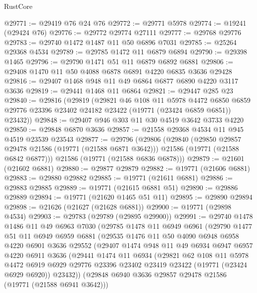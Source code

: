 \begin{lexlean}{RustCore}
\begin{coremodule}
@29771 := @29419 @76 @24 @76
@29772 := @29771 @5978
@29774 := @19241 (@29424 @76)
@29776 := @29772 @29774 @27111
@29777 := @29768 @29776
@29783 := @29740 @1472 @1487 @11 @50 @6896 @7031
@29785 := @25264 @29368 @4534
@29789 := @29785 @1472 @11 @6879 @6894
@29790 := @29398 @1465
@29796 := @29790 @1471 @51 @11 @6879 @6892 @6881
@29806 := @29408 @1470 @11 @50 @4088 @6878 @6891 @4220 @6835 @3636 @29428
@29816 := @29407 @1468 @948 @11 @49 @6864 @6877 @6890 @4220 @3117 @3636
@29819 := @29441 @1468 @11 @6864
@29821 := @29447 @285 @23
@29840 := @29816
    (@29819
      (@29821
        @46
        @108
        @11
        @5978
        @4472
        @6850
        @6859
        @29776
        @23396
        @23402
        @24182
        @23422
        (@19771 (@23424 @6859 @6851))
        @23432))
@29848 := @29407 @946 @303 @11 @30 @4519 @3642 @3733 @4220
@29850 := @29848 @6870 @3636
@29857 := @21558 @29368 @4534 @11 @945 @4519 @23539 @23543
@29877 := @29796
    (@29806
      (@29840
        (@29850 @29857 @29478 @21586 (@19771 (@21588 @6871 @3642)))
        @21586
        (@19771 (@21588 @6842 @6877)))
      @21586
      (@19771 (@21588 @6836 @6878)))
@29879 := @21601 (@21602 @6881)
@29880 := @29877 @29879
@29882 := @19771 (@21606 @6881)
@29883 := @29880 @29882
@29885 := @19771 (@21611 @6881)
@29886 := @29883 @29885
@29889 := @19771 (@21615 @6881 @51)
@29890 := @29886 @29889
@29894 := @19771 (@21620 @1465 @51 @11)
@29895 := @29890 @29894
@29898 := @21626 (@21627 (@21628 @6881))
@29900 := @19771 (@29898 @4534)
@29903 := @29783 (@29789 (@29895 @29900))
@29991 := @29740
    @1478
    @1486
    @11
    @49
    @6963
    @7030
    (@29785
      @1478
      @11
      @6949
      @6961
      (@29790
        @1477
        @51
        @11
        @6949
        @6959
        @6881
        (@29535
          @1476
          @11
          @50
          @4090
          @6948
          @6958
          @4220
          @6901
          @3636
          @29552
          (@29407
            @1474
            @948
            @11
            @49
            @6934
            @6947
            @6957
            @4220
            @6911
            @3636
            (@29441
              @1474
              @11
              @6934
              (@29821
                @62
                @108
                @11
                @5978
                @4472
                @6919
                @6929
                @29776
                @23396
                @23402
                @23419
                @23422
                (@19771 (@23424 @6929 @6920))
                @23432))
            (@29848 @6940 @3636 @29857 @29478 @21586 (@19771 (@21588 @6941 @3642)))

\end{coremodule}
\end{lexlean}
